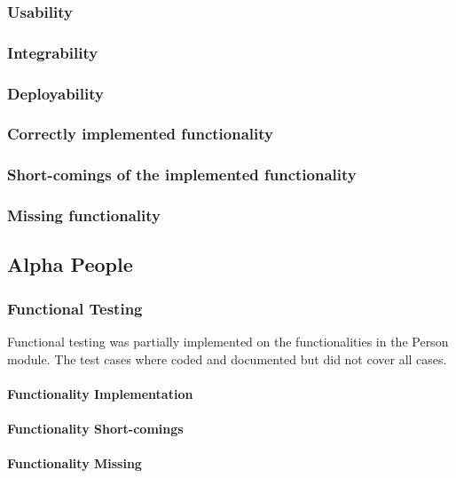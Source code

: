 \documentclass{article}
\begin{document}
        \subsubsection{Usability}
        \subsubsection{Integrability}
        \subsubsection{Deployability}
        \subsubsection{Correctly implemented functionality}
        \subsubsection{Short-comings of the implemented functionality}
        \subsubsection{Missing functionality}
        
        \subsection{Alpha People}
\subsubsection{Functional Testing}
	Functional testing was partially implemented on the functionalities in the Person module. The test cases where coded and documented but did not cover all cases.
\paragraph{Functionality Implementation}
\paragraph{Functionality Short-comings}
\paragraph{Functionality Missing}
\end{document}

